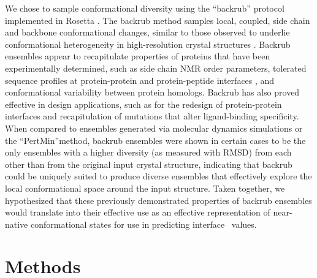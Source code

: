 We chose to sample conformational diversity using the ``backrub'' protocol implemented in Rosetta \cite{smith_backrub-like_2008}.
The backrub method samples local, coupled, side chain and backbone conformational changes, similar to those observed to underlie conformational heterogeneity in high-resolution crystal structures \cite{davis_backrub_2006}.
Backrub ensembles appear to recapitulate properties of proteins that have been experimentally determined, such as side chain NMR order parameters\cite{friedland_simple_2008}, tolerated sequence profiles at protein-protein \cite{humphris_prediction_2008} and protein-peptide interfaces \cite{smith_structure-based_2010,smith_predicting_2011}, and conformational variability between protein homologs\cite{schenkelberg_protein_2016}.
Backrub has also proved effective in design applications, such as for the redesign of protein-protein interfaces\cite{kapp_control_2012} and recapitulation of mutations that alter ligand-binding specificity\cite{ollikainen_coupling_2015}.
When compared to ensembles generated via molecular dynamics simulations or the “PertMin”method\cite{davey_improving_2014}, backrub ensembles were shown in certain cases to be
the only ensembles with a higher diversity (as measured with RMSD) from each other than from the original input crystal structure, indicating that backrub could be uniquely suited to produce diverse ensembles that effectively explore the local conformational space around the input structure.\cite{davey_improving_2014}
Taken together, we hypothesized that these previously demonstrated properties of backrub ensembles would translate into their effective use as an effective representation of near-native conformational states for use in predicting interface \ddg\ values.

\section{Methods}

